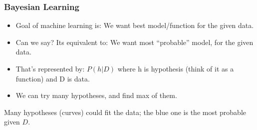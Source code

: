 \begin{frame}[fragile]\frametitle{Bayesian Learning}
\begin{itemize}
\item Goal of machine learning is: We want best model/function for the given data.
\item Can we say? Its equivalent to: We want most ``probable'' model, for the given data.
\item That's represented by: $P(h|D)$ where h is hypothesis (think of it as a function) and D is data.
\item We can try many hypotheses, and find max of them.
\end{itemize}
\begin{center}

{\small Many hypotheses (curves) could fit the data; the blue one is the most probable given $D$.}
\end{center}
\end{frame}

